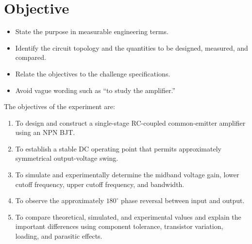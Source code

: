 \documentclass[11pt,a4paper]{article}
\begin{document}
\section{Objective}
\begin{sectionguide}
\begin{itemize}
  \item State the purpose in measurable engineering terms.
  \item Identify the circuit topology and the quantities to be designed,
        measured, and compared.
  \item Relate the objectives to the challenge specifications.
  \item Avoid vague wording such as ``to study the amplifier.''
\end{itemize}
\end{sectionguide}

\begin{examplebox}
The objectives of the experiment are:
\begin{enumerate}
  \item To design and construct a single-stage RC-coupled common-emitter
        amplifier using an NPN BJT.
  \item To establish a stable DC operating point that permits approximately
        symmetrical output-voltage swing.
  \item To simulate and experimentally determine the midband voltage gain,
        lower cutoff frequency, upper cutoff frequency, and bandwidth.
  \item To observe the approximately $180^\circ$ phase reversal between
        input and output.
  \item To compare theoretical, simulated, and experimental values and
        explain the important differences using component tolerance,
        transistor variation, loading, and parasitic effects.
\end{enumerate}
\end{examplebox}

\end{document}
